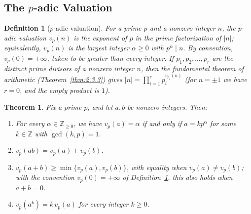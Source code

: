 \documentclass[11pt]{article}
\theoremstyle{ntstyle}
\newtheorem{theorem}{Theorem}[subsection]
\newtheorem{definition}{Definition}[subsection]
\begin{document}
\subsection{The \texorpdfstring{$p$}{p}-adic Valuation}

\begin{definition}[$p$-adic valuation]\label{def:4.5.1}
	For a prime $p$ and a nonzero integer $n$, the $p$-adic valuation
	$v_p(n)$ is the exponent of $p$ in the prime factorization of $|n|$;
	equivalently, $v_p(n)$ is the largest integer $\alpha \ge 0$ with
	$p^{\alpha} \mid n$. By convention, $v_p(0)=+\infty$, taken to be greater than every integer.
	If $p_1,p_2,\ldots,p_r$ are the distinct prime divisors of a nonzero
	integer $n$, then the fundamental theorem of arithmetic (Theorem~\ref{thm:2.3.3}) gives
	$|n|=\prod_{i=1}^{r}p_i^{v_{p_i}(n)}$ (for $n=\pm1$ we have $r=0$, and the empty product is $1$).
\end{definition}
\begin{theorem}\label{thm:4.5.1} Fix a prime $p$, and let $a,b$ be
	nonzero integers. Then:

	\begin{enumerate}[label={\alph*)}]
		\item For every $\alpha\in\mathbb{Z}_{\ge0}$, we have $v_p(a)=\alpha$ if and only if
					$a=kp^{\alpha}$ for some $k\in\mathbb{Z}$ with $\gcd(k,p)=1$.
		\item $v_p(ab) = v_p(a) + v_p(b)$.
		\item $v_p(a + b) \ge \min\{v_p(a), v_p(b)\}$, with equality when $v_p(a) \neq v_p(b)$; with the convention $v_p(0)=+\infty$ of
		      Definition~\ref{def:4.5.1}, this also holds when $a+b=0$.
		\item $v_p(a^{k}) = k\, v_p(a)$ for every integer $k \ge 0$.
	\end{enumerate}
\end{theorem}
\end{document}
